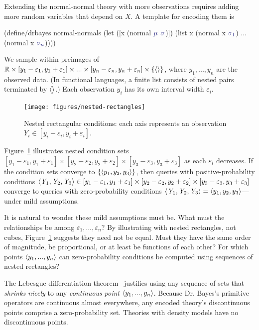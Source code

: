 Extending the normal-normal theory with more observations requires adding more random variables that depend on $\mathit{X}$.
A template for encoding them is
\begin{center}\singlespacing
\begin{schemedisplay}
(define/drbayes normal-normals
  (let ([x  (normal $\va{\mu}$ $\va{\sigma}$)])
    (list x (normal x $\va{\sigma_1}$) ... (normal x $\va{\sigma_n}$))))
\end{schemedisplay}
\end{center}
We sample within preimages of $\mathbb{R} \times [y_1-\varepsilon_1,y_1+\varepsilon_1] \times ... \times [y_n-\varepsilon_n,y_n+\varepsilon_n] \times \{{\langle{}\rangle}\}$, where $y_1,...,y_n$ are the observed data.
(In functional languages, a finite list consists of nested pairs terminated by $\langle{}\rangle$.)
Each observation $y_i$ has its own interval width $\varepsilon_i$.

\begin{figure}[tb!]\centering
\texttt{[image: figures/nested-rectangles]}
\caption[Nested rectangular conditions]{Nested rectangular conditions: each axis represents an observation {$\mathit{Y_i} \in [y_i-\varepsilon_i,y_i+\varepsilon_i]$}.}
\label{fig:nested-rectangles}
\end{figure}

Figure~\ref{fig:nested-rectangles} illustrates nested condition sets $[y_1-\varepsilon_1,y_1+\varepsilon_1] \times [y_2-\varepsilon_2,y_2+\varepsilon_2] \times [y_3-\varepsilon_3,y_3+\varepsilon_3]$ as each $\varepsilon_i$ decreases.
If the condition sets converge to $\{{\langle{y_1,y_2,y_3}\rangle}\}$, then queries with positive-probability conditions $\langle{\mathit{Y}_1,\mathit{Y}_2,\mathit{Y}_3}\rangle \in [y_1-\varepsilon_1,y_1+\varepsilon_1] \times [y_2-\varepsilon_2,y_2+\varepsilon_2] \times [y_3-\varepsilon_3,y_3+\varepsilon_3]$ converge to queries with zero-probability conditions $\langle{\mathit{Y}_1,\mathit{Y}_2,\mathit{Y}_3}\rangle = \langle{y_1,y_2,y_3}\rangle$---under mild assumptions.

It is natural to wonder these mild assumptions must be.
What must the relationships be among $\varepsilon_1,...,\varepsilon_n$?
By illustrating with nested rectangles, not cubes, Figure~\ref{fig:nested-rectangles} suggests they need not be equal.
Must they have the same order of magnitude, be proportional, or at least be functions of each other?
For which points $\langle{y_1,...,y_n}\rangle$ can zero-probability conditions be computed using sequences of nested rectangles?

The Lebesgue differentiation theorem~\cite[Chapter 7]{cit:rudin-1987book-analysis} justifies using any sequence of sets that \emph{shrinks nicely} to any \emph{continuous point} $\langle{y_1,...,y_n}\rangle$.
Because Dr. Bayes's primitive operators are continuous almost everywhere, any encoded theory's discontinuous points comprise a zero-probability set.
Theories with density models have no discontinuous points.

